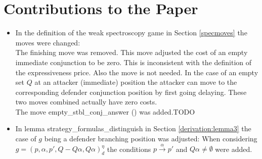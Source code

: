 \section{Contributions to the Paper}

\begin{itemize}
\item In the definition of the weak spectroscopy game in Section \ref{specmoves} the moves were changed: 
\\
The finishing move was removed. This move adjusted the cost of an empty immediate conjunction to be zero.
This is inconsistent with the definition of the expressiveness price. Also the move is not needed. In the 
case of an empty set $Q$ at an attacker (immediate) position the attacker can move to the corresponding 
defender conjunction position by first going delaying. These two moves combined actually have zero costs.
\\
The move empty\_stbl\_conj\_answer () was added.TODO
\item In lemma strategy\_formulas\_distinguish in Section \ref{derivation:lemma3} the case of $g$ being a defender branching position was adjusted: 
When considering $g=(p,\alpha ,p', Q- Q \alpha, Q \alpha)_d^\eta$ the conditions $p \overset{\alpha}{\longrightarrow} p'$ and $Q \alpha \neq \emptyset$ were 
added. 
\end{itemize}